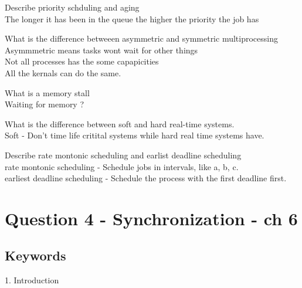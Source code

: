 \documentclass[a4paper,10pt,titlepage]{report}
\begin{document}
Describe priority schduling and aging\\
\hspace{10mm} The longer it has been in the queue the higher the priority the job has\\
\vspace{5mm}

What is the difference betweeen asymmetric and symmetric multiprocessing\\
\hspace{10mm} Asymmmetric means tasks wont wait for other things \\
\hspace{10mm} Not all processes has the some capapicities\\
\hspace{10mm} All the kernals can do the same.\\ 
\vspace{5mm}

What is a memory stall\\
\hspace{10mm} Waiting for memory ? \\
\vspace{5mm}



What is the difference between soft and hard real-time systems.\\
\hspace{10mm} Soft -  Don't time life critital systems while hard real time systems have.\\
\vspace{5mm}




Describe rate montonic scheduling and earlist deadline scheduling\\
\hspace{10mm} rate montonic scheduling - Schedule jobs in intervals, like a, b, c.\\
\hspace{10mm} earliest deadline scheduling - Schedule the process with the first deadline first.\\
\vspace{5mm}



\newpage
\section{Question 4 - Synchronization - ch 6}


\subsection{Keywords}
1. Introduction\\
\end{document}
